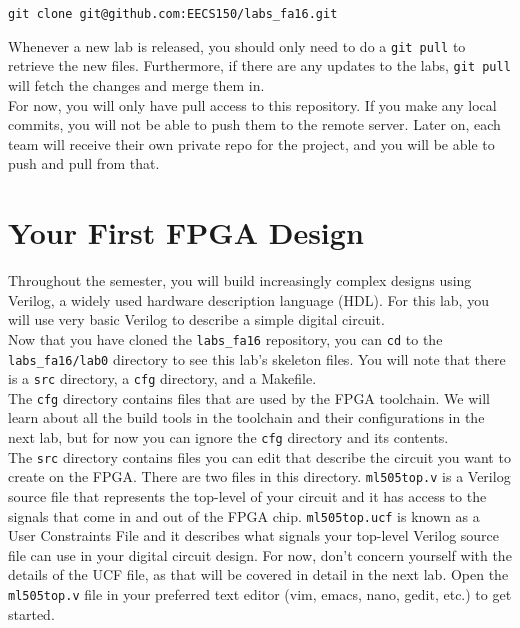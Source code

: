 \documentclass[11pt]{article}
\begin{document}
\begin{verbatim}
git clone git@github.com:EECS150/labs_fa16.git
\end{verbatim}

Whenever a new lab is released, you should only need to do a \verb|git pull| to retrieve the new files. Furthermore, if there are any updates to the labs, \verb|git pull| will fetch the changes and merge them in.\\

For now, you will only have pull access to this repository. If you make any local commits, you will not be able to push them to the remote server. Later on, each team will receive their own private repo for the project, and you will be able to push and pull from that.

\section{Your First FPGA Design}
Throughout the semester, you will build increasingly complex designs using Verilog, a widely used hardware description language (HDL). For this lab, you will use very basic Verilog to describe a simple digital circuit.\\

Now that you have cloned the \verb|labs_fa16| repository, you can \verb|cd| to the 
\verb|labs_fa16/lab0| directory to see this lab's skeleton files. You will note that there is a \verb|src| directory, a \verb|cfg| directory, and a Makefile. \\

The \verb|cfg| directory contains files that are used by the FPGA toolchain. We will learn about all the build tools in the toolchain and their configurations in the next lab, but for now you can ignore the \verb|cfg| directory and its contents. \\

The \verb|src| directory contains files you can edit that describe the circuit you want to create on the FPGA. There are two files in this directory. \verb|ml505top.v| is a Verilog source file that represents the top-level of your circuit and it has access to the signals that come in and out of the FPGA chip. \verb|ml505top.ucf| is known as a User Constraints File and it describes what signals your top-level Verilog source file can use in your digital circuit design. For now, don't concern yourself with the details of the UCF file, as that will be covered in detail in the next lab. Open the \verb|ml505top.v| file in your preferred text editor (vim, emacs, nano, gedit, etc.) to get started. \\
\end{document}
